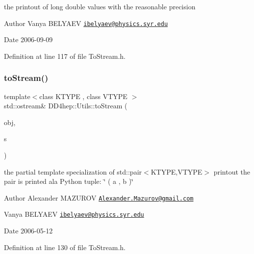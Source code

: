 the printout of long double values with the reasonable precision 

\begin{DoxyAuthor}{Author}
Vanya B\+E\+L\+Y\+A\+EV \href{mailto:ibelyaev@physics.syr.edu}{\tt ibelyaev@physics.\+syr.\+edu} 
\end{DoxyAuthor}
\begin{DoxyDate}{Date}
2006-\/09-\/09 
\end{DoxyDate}


Definition at line 117 of file To\+Stream.\+h.

\hypertarget{namespace_d_d4hep_1_1_utils_a503ee3c9f053315e32b3e5c86bc653d9}{}\label{namespace_d_d4hep_1_1_utils_a503ee3c9f053315e32b3e5c86bc653d9} 
\subsubsection{\texorpdfstring{to\+Stream()}{toStream()}\hspace{0.1cm}{\footnotesize\ttfamily [8/22]}}
{\footnotesize\ttfamily template$<$class K\+T\+Y\+PE , class V\+T\+Y\+PE $>$ \\
std\+::ostream\& D\+D4hep\+::\+Utils\+::to\+Stream (\begin{DoxyParamCaption}\item[{const std\+::pair$<$ K\+T\+Y\+PE, V\+T\+Y\+PE $>$ \&}]{obj,  }\item[{std\+::ostream \&}]{s }\end{DoxyParamCaption})\hspace{0.3cm}{\ttfamily [inline]}}

the partial template specialization of {\ttfamily std\+::pair$<$\+K\+T\+Y\+P\+E,\+V\+T\+Y\+P\+E$>$} printout the pair is printed a\textquotesingle{}la Python tuple\+: \char`\"{} ( a , b )\char`\"{} \begin{DoxyAuthor}{Author}
Alexander M\+A\+Z\+U\+R\+OV \href{mailto:Alexander.Mazurov@gmail.com}{\tt Alexander.\+Mazurov@gmail.\+com} 

Vanya B\+E\+L\+Y\+A\+EV \href{mailto:ibelyaev@physics.syr.edu}{\tt ibelyaev@physics.\+syr.\+edu} 
\end{DoxyAuthor}
\begin{DoxyDate}{Date}
2006-\/05-\/12 
\end{DoxyDate}


Definition at line 130 of file To\+Stream.\+h.



